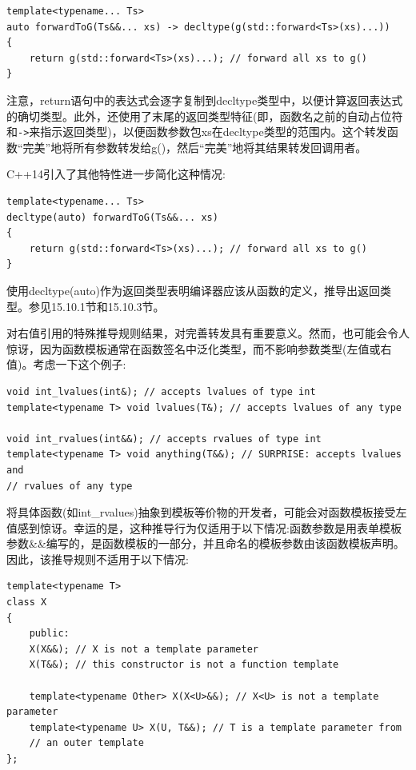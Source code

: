 \begin{lstlisting}[style=styleCXX]
template<typename... Ts>
auto forwardToG(Ts&&... xs) -> decltype(g(std::forward<Ts>(xs)...))
{
	return g(std::forward<Ts>(xs)...); // forward all xs to g()
}
\end{lstlisting}

注意，return语句中的表达式会逐字复制到decltype类型中，以便计算返回表达式的确切类型。此外，还使用了末尾的返回类型特征(即，函数名之前的自动占位符和\texttt{->}来指示返回类型)，以便函数参数包xs在decltype类型的范围内。这个转发函数“完美”地将所有参数转发给g()，然后“完美”地将其结果转发回调用者。

C++14引入了其他特性进一步简化这种情况:

\begin{lstlisting}[style=styleCXX]
template<typename... Ts>
decltype(auto) forwardToG(Ts&&... xs)
{
	return g(std::forward<Ts>(xs)...); // forward all xs to g()
}
\end{lstlisting}

使用decltype(auto)作为返回类型表明编译器应该从函数的定义，推导出返回类型。参见15.10.1节和15.10.3节。


对右值引用的特殊推导规则结果，对完善转发具有重要意义。然而，也可能会令人惊讶，因为函数模板通常在函数签名中泛化类型，而不影响参数类型(左值或右值)。考虑一下这个例子:

\begin{lstlisting}[style=styleCXX]
void int_lvalues(int&); // accepts lvalues of type int
template<typename T> void lvalues(T&); // accepts lvalues of any type

void int_rvalues(int&&); // accepts rvalues of type int
template<typename T> void anything(T&&); // SURPRISE: accepts lvalues and
// rvalues of any type
\end{lstlisting}

将具体函数(如int\_rvalues)抽象到模板等价物的开发者，可能会对函数模板接受左值感到惊讶。幸运的是，这种推导行为仅适用于以下情况:函数参数是用表单模板参数\&\&编写的，是函数模板的一部分，并且命名的模板参数由该函数模板声明。因此，该推导规则不适用于以下情况:

\begin{lstlisting}[style=styleCXX]
template<typename T>
class X
{
	public:
	X(X&&); // X is not a template parameter
	X(T&&); // this constructor is not a function template
	
	template<typename Other> X(X<U>&&); // X<U> is not a template parameter
	template<typename U> X(U, T&&); // T is a template parameter from
	// an outer template
};
\end{lstlisting}

